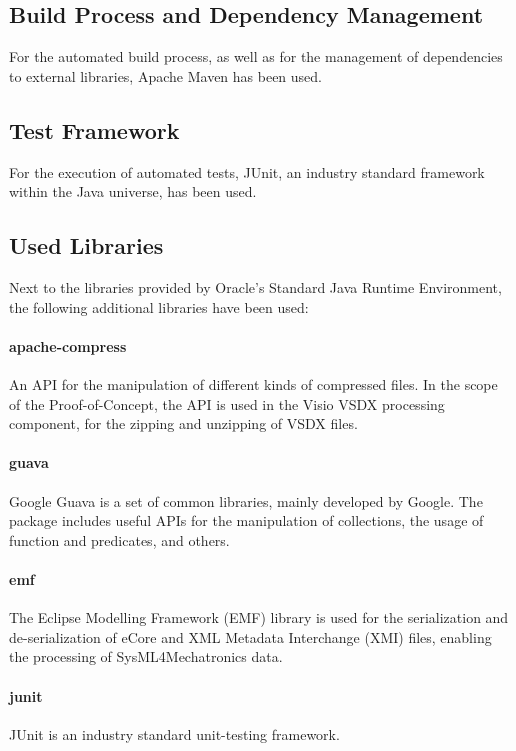 \subsection{Build Process and Dependency Management}

For the automated build process, as well as for the management of dependencies to external libraries, Apache Maven has been used.

\subsection{Test Framework}

For the execution of automated tests, JUnit, an industry standard framework within the Java universe, has been used.

\subsection{Used Libraries}

Next to the libraries provided by Oracle's Standard Java Runtime Environment, the following additional libraries have been used:

\paragraph{apache-compress} An API for the manipulation of different kinds of compressed files. In the scope of the Proof-of-Concept, the API is used in the Visio VSDX processing component, for the zipping and unzipping of VSDX files.

\paragraph{guava} Google Guava is a set of common libraries, mainly developed by Google. The package includes useful APIs for the manipulation of collections, the usage of function and predicates, and others.

\paragraph{emf} The Eclipse Modelling Framework (EMF) library is used for the serialization and de-serialization of eCore and XML Metadata Interchange (XMI) files, enabling the processing of SysML4Mechatronics data.

\paragraph{junit} JUnit is an industry standard unit-testing framework.

